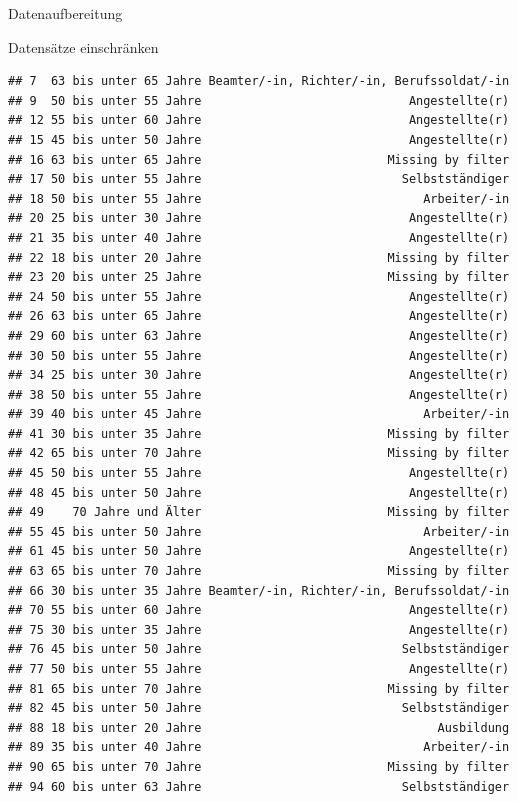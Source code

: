 \documentclass[ignorenonframetext,]{beamer}
\begin{document}
\begin{frame}[fragile]{Datenaufbereitung}
\begin{block}{Datensätze einschränken}
\begin{verbatim}
## 7  63 bis unter 65 Jahre Beamter/-in, Richter/-in, Berufssoldat/-in
## 9  50 bis unter 55 Jahre                             Angestellte(r)
## 12 55 bis unter 60 Jahre                             Angestellte(r)
## 15 45 bis unter 50 Jahre                             Angestellte(r)
## 16 63 bis unter 65 Jahre                          Missing by filter
## 17 50 bis unter 55 Jahre                            Selbstständiger
## 18 50 bis unter 55 Jahre                               Arbeiter/-in
## 20 25 bis unter 30 Jahre                             Angestellte(r)
## 21 35 bis unter 40 Jahre                             Angestellte(r)
## 22 18 bis unter 20 Jahre                          Missing by filter
## 23 20 bis unter 25 Jahre                          Missing by filter
## 24 50 bis unter 55 Jahre                             Angestellte(r)
## 26 63 bis unter 65 Jahre                             Angestellte(r)
## 29 60 bis unter 63 Jahre                             Angestellte(r)
## 30 50 bis unter 55 Jahre                             Angestellte(r)
## 34 25 bis unter 30 Jahre                             Angestellte(r)
## 38 50 bis unter 55 Jahre                             Angestellte(r)
## 39 40 bis unter 45 Jahre                               Arbeiter/-in
## 41 30 bis unter 35 Jahre                          Missing by filter
## 42 65 bis unter 70 Jahre                          Missing by filter
## 45 50 bis unter 55 Jahre                             Angestellte(r)
## 48 45 bis unter 50 Jahre                             Angestellte(r)
## 49    70 Jahre und Älter                          Missing by filter
## 55 45 bis unter 50 Jahre                               Arbeiter/-in
## 61 45 bis unter 50 Jahre                             Angestellte(r)
## 63 65 bis unter 70 Jahre                          Missing by filter
## 66 30 bis unter 35 Jahre Beamter/-in, Richter/-in, Berufssoldat/-in
## 70 55 bis unter 60 Jahre                             Angestellte(r)
## 75 30 bis unter 35 Jahre                             Angestellte(r)
## 76 45 bis unter 50 Jahre                            Selbstständiger
## 77 50 bis unter 55 Jahre                             Angestellte(r)
## 81 65 bis unter 70 Jahre                          Missing by filter
## 82 45 bis unter 50 Jahre                            Selbstständiger
## 88 18 bis unter 20 Jahre                                 Ausbildung
## 89 35 bis unter 40 Jahre                               Arbeiter/-in
## 90 65 bis unter 70 Jahre                          Missing by filter
## 94 60 bis unter 63 Jahre                            Selbstständiger

\end{verbatim}
\end{block}
\end{frame}
\end{document}
